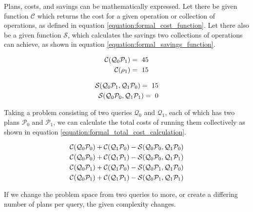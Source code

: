 Plans, costs, and savings can be mathematically expressed. Let there be given function $\mathcal{C}$ which returns the cost for a given operation or collection of operations, as defined in equation \ref{equation:formal_cost_function}. Let there also be a given function $\mathcal{S}$, which calculates the savings two collections of operations can achieve, as shown in equation \ref{equation:formal_savings_function}.

\begin{equation}
    \centering
    \begin{split}
        \mathcal{C}(\mathcal{Q}_0\mathcal{P}_1) =\ 45 \\
        \mathcal{C}(\rho_1) =\ 15 \\
    \end{split}
    \label{equation:formal_cost_function}
\end{equation}

\begin{equation}
    \centering
    \begin{split}
        \mathcal{S}(\mathcal{Q}_0\mathcal{P}_1, \mathcal{Q}_1\mathcal{P}_0) =\ 15 \\
        \mathcal{S}(\mathcal{Q}_0\mathcal{P}_0, \mathcal{Q}_1\mathcal{P}_1) =\ 0 \\
    \end{split}
    \label{equation:formal_savings_function}
\end{equation}


Taking a problem consisting of two queries $\mathcal{Q}_0$ and $\mathcal{Q}_1$, each of which has two plans $\mathcal{P}_0$ and $\mathcal{P}_1$, we can calculate the total costs of running them collectively as shown in equation \ref{equation:formal_total_cost_calculation}.

\begin{equation}
    \centering
    \begin{split}
        \mathcal{C}(\mathcal{Q}_0\mathcal{P}_0) + \mathcal{C}(\mathcal{Q}_1\mathcal{P}_0) - \mathcal{S}(\mathcal{Q}_0\mathcal{P}_0, \mathcal{Q}_1\mathcal{P}_0) \\
        \mathcal{C}(\mathcal{Q}_0\mathcal{P}_0) + \mathcal{C}(\mathcal{Q}_1\mathcal{P}_1) - \mathcal{S}(\mathcal{Q}_0\mathcal{P}_0, \mathcal{Q}_1\mathcal{P}_1) \\
        \mathcal{C}(\mathcal{Q}_0\mathcal{P}_1) + \mathcal{C}(\mathcal{Q}_1\mathcal{P}_0) - \mathcal{S}(\mathcal{Q}_0\mathcal{P}_1, \mathcal{Q}_1\mathcal{P}_0) \\
        \mathcal{C}(\mathcal{Q}_0\mathcal{P}_1) + \mathcal{C}(\mathcal{Q}_1\mathcal{P}_1) - \mathcal{S}(\mathcal{Q}_0\mathcal{P}_1, \mathcal{Q}_1\mathcal{P}_1) \\
    \end{split}
    \label{equation:formal_total_cost_calculation}
\end{equation}

If we change the problem space from two queries to more, or create a differing number of plans per query, the given complexity changes.

